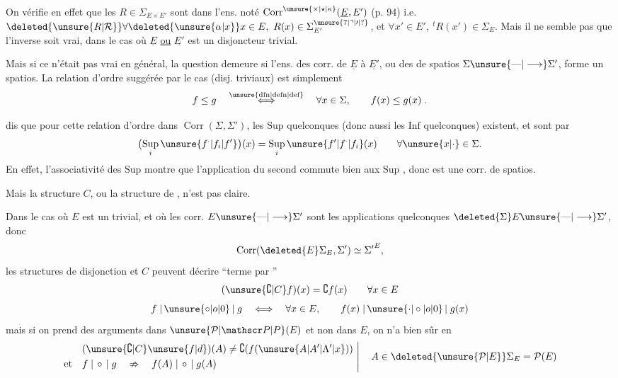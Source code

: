 On vérifie en effet que les  $R\in\Sigma_{E\times E'}$ sont dans l'ens. noté $\operatorname{Corr}^{\unsure{\times|\star|\kappa}}(\underline E,E')$ (p. 94) i.e. $\deleted{\unsure{R|\mathcal R}}\forall \deleted{\unsure{\alpha|x}}x\in E,\ R(x)\in\Sigma_{E'}^{\unsure{7|\urcorner|\prime|?}}$, et $\forall x'\in E',\ {}^{t}R(x')\in\Sigma_E$. Mais il ne semble pas que  l'inverse soit vrai,  dans le cas où $\underline E$ \uline{ou} $\underline{E'}$ est un disjoncteur trivial.

Mais si ce n'était pas vrai en général, la question demeure si l'ens. des  corr. de $\underline E$ à $\underline{E'}$, ou  des  de spatios $\Sigma\unsure{\mbox{---}|\longrightarrow}\Sigma'$, forme un spatios. La relation d'ordre suggérée par le cas  (disj. triviaux) est simplement
\[
 f\leq g\quad\overset{\text{\unsure{dfn|defn|def}}}{\Longleftrightarrow}\quad
 \forall x\in\Sigma,\qquad f(x)\leq g(x)\;.
\]

 dis que pour cette relation d'ordre dans $\operatorname{Corr}(\Sigma,\Sigma')$, les $\mathrm{Sup}$ quelconques (donc aussi les $\mathrm{Inf}$ quelconques) existent, et sont  par
\[
 \bigl(\mathop{\mathrm{Sup}}\limits_i \unsure{f^{\cdot}|f_i|f'}\bigr)(x)
 =\mathop{\mathrm{Sup}}\limits_i \unsure{f^{\prime}|f^{\cdot}|f_i}(x)\qquad\forall \unsure{x|\cdot}\in\Sigma.
\]
En effet, l'associativité des $\mathrm{Sup}$ montre que l'application du second  commute bien aux $\mathrm{Sup}$ , donc est une corr. de spatios.

Mais la structure $C$, ou la structure de , n'est pas claire.

Dans le cas où $E$ est un  trivial,  et où les corr. $E\unsure{\mbox{---}|\longrightarrow}\Sigma'$ sont  les applications quelconques $\deleted{\Sigma}E\unsure{\mbox{---}|\longrightarrow}\Sigma'$, donc
\[
 \operatorname{Corr}(\deleted{E}\Sigma_E,\Sigma')\simeq{\Sigma'}^{E},
\]
les structures de disjonction et $C$ peuvent  décrire ``terme par ''
\[
 (\unsure{\complement|C} f)(x)=\complement f(x)\qquad\forall x\in E
\]
\[
 f\mathrel{|\,\unsure{\circ|o|0}\,|}g\quad\Longleftrightarrow\quad
 \forall x\in E,\qquad f(x)\mathrel{|\,\unsure{\cdot|\circ|o|0}\,|}g(x)
\]
mais si on prend des arguments dans $\unsure{\mathcal P|\mathscr P|P}(E)$ et non dans $E$, on n'a bien sûr  en 
\[
 \left.\begin{aligned}
 &(\unsure{\complement|C}\unsure{f|d})(A)\ne\complement(f(\unsure{A|A'|\Lambda'|x}))\\
 \text{et}\quad &f\mathrel{|\,\circ\,|}g\quad\nRightarrow\quad f(A)\mathrel{|\,\circ\,|}g(A)
 \end{aligned}\ \right|\quad A\in\deleted{\unsure{\mathcal P|E}}\Sigma_E=\mathcal P(E)
\]

